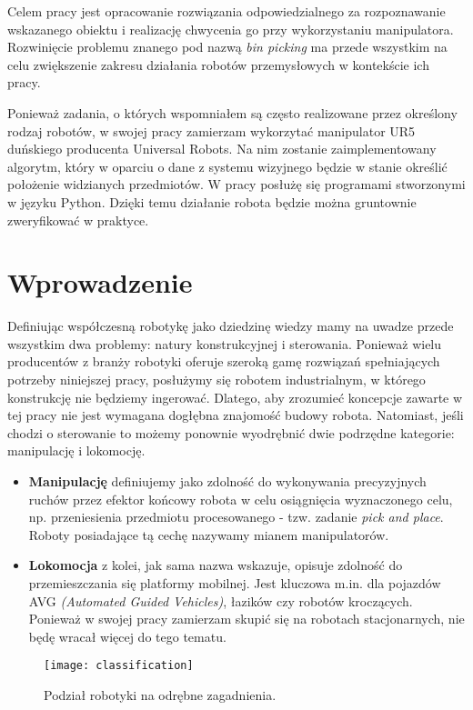 \documentclass[12pt]{article}
\begin{document}
Celem pracy jest opracowanie rozwiązania odpowiedzialnego za rozpoznawanie wskazanego obiektu i realizację chwycenia go przy wykorzystaniu manipulatora. Rozwinięcie problemu znanego pod nazwą \emph{bin picking} ma przede wszystkim na celu zwiększenie zakresu działania robotów przemysłowych w kontekście ich pracy.

Ponieważ zadania, o których wspomniałem są często realizowane przez określony rodzaj robotów, w swojej pracy zamierzam wykorzytać manipulator UR5 duńskiego producenta Universal Robots. Na nim zostanie zaimplementowany algorytm, który w oparciu o dane z systemu wizyjnego będzie w stanie określić położenie widzianych przedmiotów. W pracy posłużę się programami stworzonymi w języku Python. Dzięki temu działanie robota będzie można gruntownie zweryfikować w praktyce.

\newpage
\section{Wprowadzenie}
Definiując współczesną robotykę jako dziedzinę wiedzy mamy na uwadze przede wszystkim dwa problemy: natury konstrukcyjnej i sterowania. Ponieważ wielu producentów z branży robotyki oferuje szeroką gamę rozwiązań spełniających potrzeby niniejszej pracy, posłużymy się robotem industrialnym, w którego konstrukcję nie będziemy ingerować. Dlatego, aby zrozumieć koncepcje zawarte w tej pracy nie jest wymagana dogłębna znajomość budowy robota. Natomiast, jeśli chodzi o sterowanie to możemy ponownie wyodrębnić dwie podrzędne kategorie: manipulację i lokomocję. 

\begin{itemize}
\item \textbf{Manipulację} definiujemy jako zdolność do wykonywania precyzyjnych ruchów przez efektor końcowy robota w celu osiągnięcia wyznaczonego celu, np. przeniesienia przedmiotu procesowanego - tzw. zadanie \emph{pick and place}. Roboty posiadające tą cechę nazywamy mianem manipulatorów.

\item \textbf{Lokomocja} z kolei, jak sama nazwa wskazuje, opisuje zdolność do przemieszczania się platformy mobilnej. Jest kluczowa m.in. dla pojazdów AVG \emph{(Automated Guided Vehicles)}, łazików czy robotów kroczących. Ponieważ w swojej pracy zamierzam skupić się na robotach stacjonarnych, nie będę wracał więcej do tego tematu.
\end{itemize}

\begin{figure}[h]
\centering
\texttt{[image: classification]}
\caption{Podział robotyki na odrębne zagadnienia.}
\end{figure}
\end{document}
